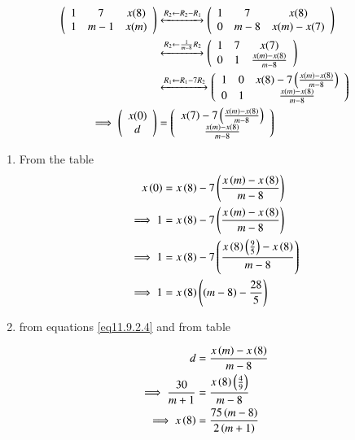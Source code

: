\documentclass[journal,12pt,onecolumn]{IEEEtran}
\theoremstyle{remark}
\begin{document}
\begin{align}
\left(
\begin{array}{ccc}
1 & 7 & x(8) \\
1 & m-1 & x(m)
\end{array}
\right)
&\xleftrightarrow[]{R_2 \leftarrow R_2-R_1}
\left(
\begin{array}{ccc}
1 & 7 & x(8) \\
0 & m-8 & x(m)-x(7)
\end{array}
\right)
\\
&\xleftrightarrow[]{R_2 \leftarrow \frac{1}{m-8}R_2}
\left(
\begin{array}{ccc}
1 & 7 & x(7) \\
0 & 1 & \frac{x(m)-x(8)}{m-8}
\end{array}
\right)
\\
&\xleftrightarrow[]{R_1 \leftarrow R_1-7R_2}
\left(
\begin{array}{ccc}
1 & 0 & x(8)-7\left(\frac{x(m)-x(8)}{m-8}\right) \\
0 & 1 & \frac{x(m)-x(8)}{m-8}
\end{array}
\right)
\\
\implies \left(
\begin{array}{c}
x(0) \\
d
\end{array}
\right)
&=
\left(
\begin{array}{c}
x(7)-7\left(\frac{x(m)-x(8)}{m-8}\right) \\
\frac{x(m)-x(8)}{m-8}
\end{array}
\right)
\end{align}
\begin{enumerate}
    \item From the table\\
\begin{align}
    x\left(0\right)&=x\left(8\right)-7\left(\frac{x\left(m\right)-x\left(8\right)}{m-8}\right)\\
    \implies1&=x\left(8\right)-7\left(\frac{x\left(m\right)-x\left(8\right)}{m-8}\right)\\
    \implies1&=x\left(8\right)-7\left(\frac{x\left(8\right)\left(\frac{9}{5}\right)-x\left(8\right)}{m-8}\right)\\
    \implies1&=x\left(8\right)\left(\left(m-8\right)-\frac{28}{5}\right) \label{eq11.9.2.14}
\end{align}
\item from equations \eqref{eq11.9.2.4} and from table\\
\end{enumerate}
 \begin{align}
    d&=\frac{x\left(m\right)-x\left(8\right)}{m-8}\\
    \implies\frac{30}{m+1}&=\frac{x\left(8\right)\left(\frac{4}{9}\right)}{m-8}\\ \label{eq11.9.2.17}
    \implies x\left(8\right)&=\frac{75\left(m-8\right)}{2\left(m+1\right)}
 \end{align}
\end{document}
